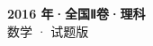 \documentclass[zihao=-4, a4paper]{ctexart}
\begin{document}
\begin{center}
  {\Large\bfseries 2016 年·全国Ⅱ卷·理科}\\[4pt]
  {\large 数学 · 试题版}
\end{center}
\medskip
{}

\end{document}
